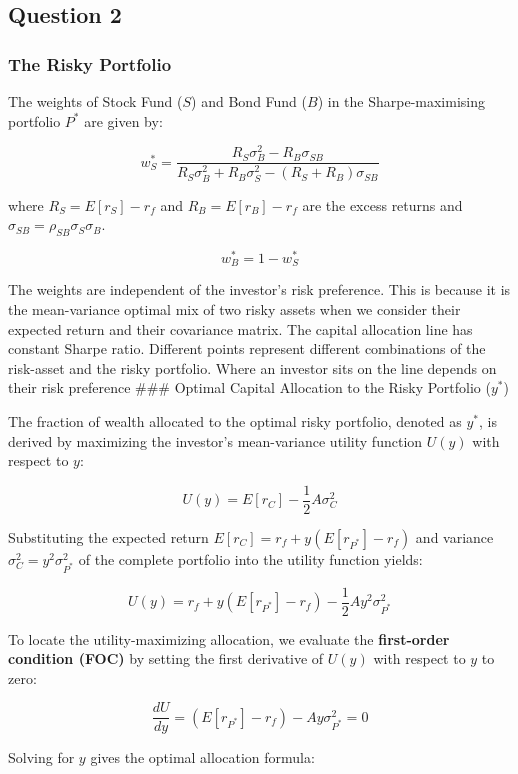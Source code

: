\documentclass[11pt]{article}
\begin{document}
    \subsection{Question 2}\label{question-2}

\subsubsection{The Risky Portfolio}\label{the-risky-portfolio}

The weights of Stock Fund (\(S\)) and Bond Fund (\(B\)) in the
Sharpe-maximising portfolio \(P^*\) are given by:

\[w_S^* = \frac{R_S \sigma_B^2 - R_B \sigma_{SB}}{R_S \sigma_B^2 + R_B \sigma_S^2 - (R_S + R_B) \sigma_{SB}}\]

where \(R_S = E[r_S] - r_f\) and \(R_B = E[r_B] - r_f\) are the excess
returns and \(\sigma_{SB} = \rho_{SB}\sigma_S\sigma_B\).

\[w_B^* = 1 - w_S^*\]

The weights are independent of the investor's risk preference. This is
because it is the mean-variance optimal mix of two risky assets when we
consider their expected return and their covariance matrix. The capital
allocation line has constant Sharpe ratio. Different points represent
different combinations of the risk-asset and the risky portfolio. Where
an investor sits on the line depends on their risk preference \#\#\#
Optimal Capital Allocation to the Risky Portfolio (\(y^*\))

The fraction of wealth allocated to the optimal risky portfolio, denoted
as \(y^*\), is derived by maximizing the investor's mean-variance
utility function \(U(y)\) with respect to \(y\):

\[U(y) = E[r_C] - \frac{1}{2} A \sigma_C^2\]

Substituting the expected return \(E[r_C] = r_f + y(E[r_{P^*}] - r_f)\)
and variance \(\sigma_C^2 = y^2 \sigma_{P^*}^2\) of the complete
portfolio into the utility function yields:

\[U(y) = r_f + y\left(E[r_{P^*}] - r_f\right) - \frac{1}{2} A y^2 \sigma_{P^*}^2\]

To locate the utility-maximizing allocation, we evaluate the
\textbf{first-order condition (FOC)} by setting the first derivative of
\(U(y)\) with respect to \(y\) to zero:

\[\frac{dU}{dy} = \left(E[r_{P^*}] - r_f\right) - A y \sigma_{P^*}^2 = 0\]

Solving for \(y\) gives the optimal allocation formula:
\end{document}
